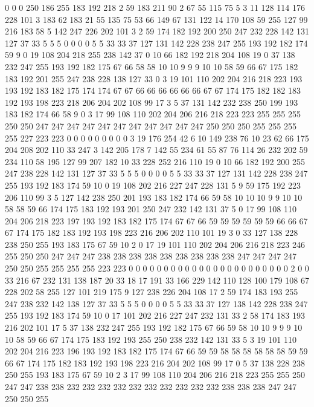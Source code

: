 0 0 0 250 186 255 183 192 218 2 59 183 211 90 2 67 55 115 75 5
3 11 128 114 176 228 101 3 183 62 183 21 55 135 75 53 66 149 67 131
122 14 170 108 59 255 127 99 216 183 58 5 142 247 226 202 101 3 2 59
174 182 192 200 250 247 232 228 142 131 127 37 33 5 5 5 0 0 0 0
5 5 33 33 37 127 131 142 228 238 247 255 193 192 182 174 59 9 0 19
108 204 218 255 238 142 37 0 10 66 182 192 218 204 108 19 0 37 138 232
247 255 193 192 182 175 67 66 58 58 10 10 9 9 9 10 10 58 59 66
67 175 182 183 192 201 255 247 238 228 138 127 33 0 3 19 101 110 202 204
216 218 223 193 193 192 183 182 175 174 174 67 67 66 66 66 66 66 66 67
67 174 175 182 182 183 192 193 198 223 218 206 204 202 108 99 17 3 5 37
131 142 232 238 250 199 193 183 182 174 66 58 9 0 3 17 99 108 110 202
204 206 216 218 223 223 255 255 255 250 250 247 247 247 247 247 247 247 247 247
247 247 250 250 250 255 255 255 255 227 223 223 0 0 0 0 0 0 0 0
0 3 19 176 254 42 6 10 149 238 76 10 23 62 66 175 204 208 202 110
33 247 3 142 205 178 7 142 55 234 61 55 87 76 114 26 232 202 59 234
110 58 195 127 99 207 182 10 33 228 252 216 110 19 0 10 66 182 192 200
255 247 238 228 142 131 127 37 33 5 5 5 0 0 0 0 5 5 33 33
37 127 131 142 228 238 247 255 193 192 183 174 59 10 0 19 108 202 216 227
247 228 131 5 9 59 175 192 223 206 110 99 3 5 127 142 238 250 201 193
183 182 174 66 59 58 10 10 10 9 9 10 10 58 58 59 66 174 175 183
192 193 201 250 247 232 142 131 37 5 0 17 99 108 110 204 206 218 223 197
193 192 183 182 175 174 67 67 66 59 59 59 59 59 59 66 66 67 67 174
175 182 183 192 193 198 223 216 206 202 110 101 19 3 0 33 127 138 228 238
250 255 193 183 175 67 59 10 2 0 17 19 101 110 202 204 206 216 218 223
246 255 250 250 247 247 247 238 238 238 238 238 238 238 238 238 247 247 247 247
250 250 255 255 255 255 223 223 0 0 0 0 0 0 0 0 0 0 0 0
0 0 0 0 0 0 0 0 0 0 0 2 0 0 33 216 67 232 131 138
187 20 33 18 17 191 33 166 229 142 110 128 100 179 108 67 228 202 58 255
127 101 219 175 9 127 238 226 204 108 17 2 59 174 183 193 255 247 238 232
142 138 127 37 33 5 5 5 0 0 0 0 5 5 33 33 37 127 138 142
228 238 247 255 193 192 183 174 59 10 0 17 101 202 216 227 247 232 131 33
2 58 174 183 193 216 202 101 17 5 37 138 232 247 255 193 192 182 175 67
66 59 58 10 10 9 9 9 10 10 58 59 66 67 174 175 183 192 193 255
250 238 232 142 131 33 5 3 19 101 110 202 204 216 223 196 193 192 183 182
175 174 67 66 59 59 58 58 58 58 58 58 59 59 66 67 174 175 182 183
192 193 198 223 216 204 202 108 99 17 0 5 37 138 228 238 250 255 193 183
175 67 59 10 2 3 17 99 108 110 204 206 216 218 223 255 255 250 247 247
238 238 232 232 232 232 232 232 232 232 232 232 238 238 238 247 247 250 250 255
